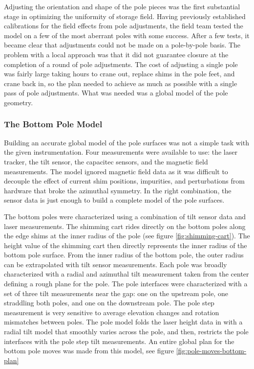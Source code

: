 Adjusting the orientation and shape of the pole pieces was the first substantial stage in optimizing the uniformity of \gmtwo storage field.  Having previously established calibrations for the field effects from pole adjustments, the \gmtwo field team tested the model on a few of the most aberrant poles with some success.  After a few tests, it became clear that adjustments could not be made on a pole-by-pole basis.  The problem with a local approach was that it did not guarantee closure at the completion of a round of pole adjustments.  The cost of adjusting a single pole was fairly large taking hours to crane out, replace shims in the pole feet, and crane back in, so the plan needed to achieve as much as possible with a single pass of pole adjustments.  What was needed was a global model of the pole geometry.

\subsubsection{The Bottom Pole Model}

Building an accurate global model of the pole surfaces was not a simple task with the given instrumentation.  Four measurements were available to use: the laser tracker, the tilt sensor, the capacitec sensors, and the magnetic field measurements.  The model ignored magnetic field data as it was difficult to decouple the effect of current shim positions, impurities, and perturbations from hardware that broke the azimuthal symmetry.  In the right combination, the sensor data is just enough to build a complete model of the pole surfaces.

The bottom poles were characterized using a combination of tilt sensor data and laser measurements.  The shimming cart rides directly on the bottom poles along the edge shims at the inner radius of the pole (see figure \ref{fig:shimming-cart}). The height value of the shimming cart then directly represents the inner radius of the bottom pole surface.  From the inner radius of the bottom pole, the outer radius can be extrapolated with tilt sensor measurements.  Each pole was broadly characterized with a radial and azimuthal tilt measurement taken from the center defining a rough plane for the pole.  The pole interfaces were characterized with a set of three tilt measurements near the gap: one on the upstream pole, one straddling both poles, and one on the downstream pole.  The pole step measurement is very sensitive to average elevation changes and rotation mismatches between poles.  The pole model folds the laser height data in with a radial tilt model that smoothly varies across the pole, and then, restricts the pole interfaces with the pole step tilt measurements.  An entire global plan for the bottom pole moves was made from this model, see figure \ref{fig:pole-moves-bottom-plan}


